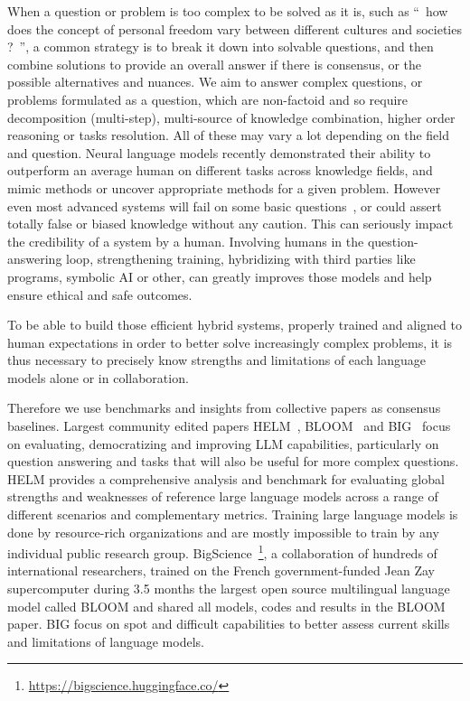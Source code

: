 \documentclass[acmsmall]{acmart}
\begin{document}
When a question or problem is too complex to be solved as it is, such as ``~how does the concept of personal freedom vary between different cultures and societies ?~'', a common strategy is to break it down into solvable questions, and then combine solutions to provide an overall answer if there is consensus, or the possible alternatives and nuances. We aim to answer complex questions, or problems formulated as a question,  which are non-factoid and so require decomposition (multi-step), multi-source of knowledge combination, higher order reasoning or tasks resolution. All of these may vary a lot depending on the field and question. Neural language models recently demonstrated their ability to outperform an average human on different tasks across knowledge fields, and mimic methods or uncover appropriate methods for a given problem. However even most advanced systems will fail on some basic questions~\citep{borjiCategoricalArchiveChatGPT2023}, or could assert totally false or biased knowledge without any caution. This can seriously impact the credibility of a system by a human. Involving humans in the question-answering loop, strengthening training, hybridizing with third parties like programs, symbolic AI or other, can greatly improves those models and help ensure ethical and safe outcomes.

To be able to build those efficient hybrid systems, properly trained and aligned to human expectations in order to better solve increasingly complex problems, it is thus necessary to precisely know strengths and limitations of each language models alone or in collaboration.

Therefore we use benchmarks and insights from collective papers as consensus baselines. Largest community edited papers HELM~\citep{liangetal.HolisticEvaluationLanguage2022}, BLOOM~\citep{bigscienceetal.BLOOM176BParameterOpenAccess2022} and BIG~\citep{bigetal.ImitationGameQuantifying2022} focus on evaluating, democratizing and improving LLM capabilities, particularly on question answering and tasks that will also be useful for more complex questions. HELM provides a comprehensive analysis and benchmark for evaluating global strengths and weaknesses of reference large language models across a range of different scenarios and complementary metrics. Training large language models is done by resource-rich organizations and are mostly impossible to train by any individual public research group. BigScience~\footnote{\url{https://bigscience.huggingface.co/}}, a collaboration of hundreds of international researchers, trained on the French government-funded Jean Zay supercomputer during 3.5 months the largest open source multilingual language model called BLOOM and shared all models, codes and results in the BLOOM paper. BIG focus on spot and difficult capabilities to better assess current skills and limitations of language models.
\end{document}
